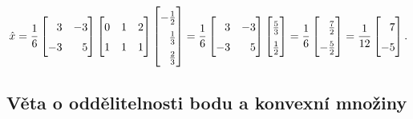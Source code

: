 \[
    \hat x = \frac{1}{6}
    \begin{bmatrix}
        \phantom{-}3 & -3 \\
        -3 & \phantom{-}5
    \end{bmatrix}
    \begin{bmatrix}
        0 & 1 & 2 \\
        1 & 1 & 1
    \end{bmatrix}
    \begingroup
        \renewcommand*{\arraystretch}{1.5}
        \begin{bmatrix}
            -\frac{1}{2} \\
            \phantom{-}\frac{1}{3} \\
            \phantom{-}\frac{2}{3}
        \end{bmatrix}
    \endgroup = \frac{1}{6}
    \begin{bmatrix}
        \phantom{-}3 & -3 \\
        -3 & \phantom{-}5
    \end{bmatrix}
    \begingroup
        \renewcommand*{\arraystretch}{1.5}
        \begin{bmatrix}
            \frac{5}{3} \\
            \frac{1}{2}
        \end{bmatrix}
    \endgroup = \frac{1}{6}
    \begingroup
        \renewcommand*{\arraystretch}{1.5}
        \begin{bmatrix}
            \phantom{-}\frac{7}{2} \\
            -\frac{5}{2}
        \end{bmatrix}
    \endgroup = \frac{1}{12}
    \begin{bmatrix}
        \phantom{-}7 \\
        -5
    \end{bmatrix}.
\]

\subsection{Věta o oddělitelnosti bodu a konvexní množiny}
